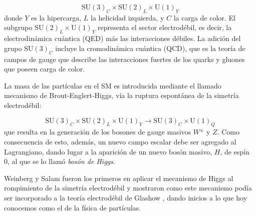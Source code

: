 \begin{equation}
  \text{SU}(3)_C \times \text{SU}(2)_L \times \text{U}(1)_Y
\end{equation}
%
donde $Y$ es la hipercarga, $L$ la helicidad izquierda, y $C$ la carga de color.
El subgrupo
$\text{SU}(2)_L \times \text{U}(1)_Y$ representa el sector electrodébil, es
decir, la electrodinámica cuántica (QED) más las interacciones débiles.
La adición del grupo $\text{SU}(3)_C$ incluye la cromodinámica cuántica (QCD), que
es la teoría de campos de gauge que describe las interacciones fuertes de los
quarks y gluones que poseen carga de color.

La masa de las partículas en el SM es introducida mediante el llamado mecanismo
de Brout-Englert-Higgs\cite{PhysRevLett.13.321,PhysRevLett.13.508}, vía la
ruptura espontánea de la simetría electrodébil:

\begin{equation}
  \text{SU}(3)_C \times \text{SU}(2)_L \times \text{U}(1)_Y \to \text{SU}(3)_C
  \times \text{U}(1)_Q
\end{equation}
%
que resulta en la generación de los bosones de gauge masivos $W^\pm$ y $Z$. Como
consecuencia de esto, además, un nuevo campo escalar debe ser agregado al
Lagrangiano, dando lugar a la aparición de un nuevo bosón masivo, $H$, de espín
0, al que se lo llamó \emph{bosón de Higgs}.

Weinberg y Salam fueron los primeros en aplicar el mecanismo de Higgs al
rompimiento de la simetría electrodébil
\cite{PhysRevLett.19.1264,PhysRev.127.965} y mostraron como este mecanismo podía
ser incorporado a la teoría electrodébil de Glashow \cite{Glashow1961579}, dando
inicios a lo que hoy conocemos como el {\SM} de la física de partículas.

